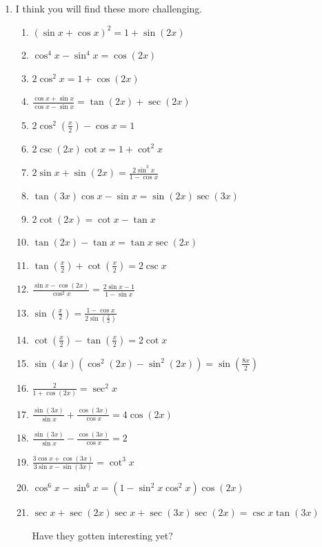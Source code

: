 \documentclass[english]{book}
\begin{document}
\begin{enumerate}
  \item I think you will find these more challenging. \begin{enumerate}  %
    \item $(\sin x + \cos x)^2 = 1 + \sin (2x)$
    \item $\cos^{4} x - \sin^{4} x = \cos (2x)$
    \item $2 \cos^{2} x = 1 + \cos (2x)$
    \item $\frac{\cos x + \sin x}{\cos x - \sin x} = \tan (2x) + \sec (2x)$
    \item $2 \cos^{2}(\frac{x}{2} ) - \cos x = 1$
    \item $2 \csc (2x) \cot x = 1 + \cot^{2} x$
    \item $2 \sin x + \sin (2x) = \frac{2  \sin^{3} x}{1 - \cos x}$
    \item $\tan (3x) \cos x - \sin x = \sin (2x) \sec (3x)$
    \item $2 \cot (2x) = \cot x - \tan x$
    \item $\tan (2x) - \tan x = \tan x \sec (2x)$
    \item $\tan (\frac{x}{2}) + \cot(\frac{x}{2}) = 2 \csc x$
    \item $\frac{\sin x - \cos(2x)}{\cos^{2} x} = \frac{2 \sin x - 1}{1 - \sin x}$
    \item $\sin (\frac{x}{2}) = \frac{ 1 - \cos x }{ 2  \sin (\frac{x}{2}) }$
    \item $\cot (\frac{x}{2}) - \tan(\frac{x}{2}) = 2 \cot x$
    \item $\sin (4x) ( \cos^{2} (2x) - \sin^{2} (2x) ) = \sin (\frac{8x}{2})$
    \item $\frac{2}{1 + \cos(2x) } = \sec^{2} x$
    \item $\frac{\sin (3x) }{\sin x} + \frac{\cos (3x) }{\cos x} = 4 \cos (2x)$
    \item $\frac{\sin (3x) }{\sin x} - \frac{\cos (3x) }{\cos x} = 2$
    \item $\frac{3 \cos x + \cos (3x) }{3 \sin x - \sin (3x) } = \cot^{3} x$
    \item $\cos^{6} x - \sin^{6} x = (1 - \sin^{2} x \cos^{2} x) \cos (2x)$
    \item $\sec x + \sec (2x) \sec x + \sec (3x) \sec (2x) = \csc x \tan (3x)$

          \vspace{0.3cm}
          
          Have they gotten interesting yet?
  \end{enumerate}


\end{enumerate}
\end{document}
